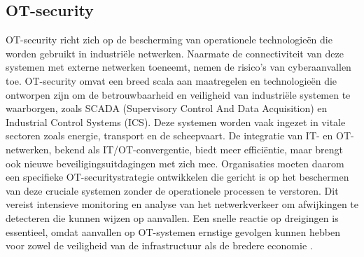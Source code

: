 \subsection{OT-security}
OT-security richt zich op de bescherming van operationele technologieën die worden gebruikt in industriële netwerken. Naarmate de connectiviteit van deze systemen 
met externe netwerken toeneemt, nemen de risico’s van cyberaanvallen toe. OT-security omvat een breed scala aan maatregelen en technologieën die ontworpen zijn om 
de betrouwbaarheid en veiligheid van industriële systemen te waarborgen, zoals SCADA (Supervisory Control And Data Acquisition) en Industrial Control Systems (ICS). Deze systemen worden vaak ingezet in vitale 
sectoren zoals energie, transport en de scheepvaart. De integratie van IT- en OT-netwerken, bekend als IT/OT-convergentie, biedt meer efficiëntie, maar brengt ook nieuwe 
beveiligingsuitdagingen met zich mee. Organisaties moeten daarom een specifieke OT-securitystrategie ontwikkelen die gericht is op het beschermen van deze cruciale systemen 
zonder de operationele processen te verstoren. Dit vereist intensieve monitoring en analyse van het netwerkverkeer om afwijkingen te detecteren die kunnen wijzen op aanvallen. 
Een snelle reactie op dreigingen is essentieel, omdat aanvallen op OT-systemen ernstige gevolgen kunnen hebben voor zowel de veiligheid van de infrastructuur als de bredere economie \autocite{Nomios2024}.



